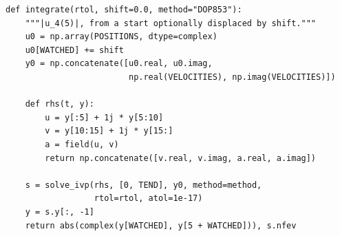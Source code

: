 \begin{verbatim}
def integrate(rtol, shift=0.0, method="DOP853"):
    """|u_4(5)|, from a start optionally displaced by shift."""
    u0 = np.array(POSITIONS, dtype=complex)
    u0[WATCHED] += shift
    y0 = np.concatenate([u0.real, u0.imag,
                         np.real(VELOCITIES), np.imag(VELOCITIES)])

    def rhs(t, y):
        u = y[:5] + 1j * y[5:10]
        v = y[10:15] + 1j * y[15:]
        a = field(u, v)
        return np.concatenate([v.real, v.imag, a.real, a.imag])

    s = solve_ivp(rhs, [0, TEND], y0, method=method,
                  rtol=rtol, atol=1e-17)
    y = s.y[:, -1]
    return abs(complex(y[WATCHED], y[5 + WATCHED])), s.nfev
\end{verbatim}
